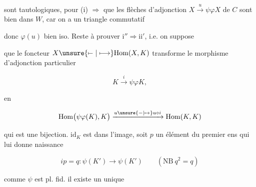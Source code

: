 
sont tautologiques,   pour (i) $\Longrightarrow$  que  les flèches d'adjonction $X\xrightarrow{u}\psi\varphi X$ de $C$ sont bien dans $W$, car on a un triangle commutatif


donc $\varphi(u)$ bien iso. Reste à prouver $\mathrm{i}''\Longrightarrow\mathrm{ii}'$, i.e. on suppose


que le foncteur $X\unsure{\mapstochar\relbar|\longmapsto}\mathrm{Hom}(X,K)$ transforme le morphisme d'adjonction particulier 

\[
 K\xrightarrow{i}\psi\varphi K,
\]

en

\[
 \mathrm{Hom}\bigl(\psi\varphi(K),K\bigr)
 \xrightarrow{u\unsure{\relbar|\mapsto}u\circ i}\mathrm{Hom}(K,K)
\]

qui est une bijection.  $\mathrm{id}_K$ est dans l'image, soit $p$ un élément du premier ens qui lui donne naissance



\[
 ip=q:\psi(K')\longrightarrow\psi(K')\qquad(\mathrm{NB}\ q^2=q)
\]

comme $\psi$ est pl. fid. il existe un unique

